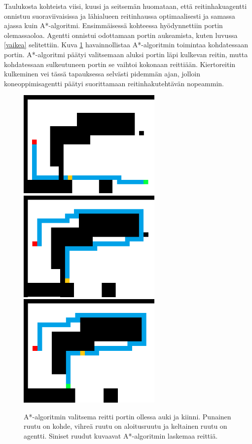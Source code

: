 \documentclass[utf8]{gradu3}
\begin{document}
Taulukosta kohteista viisi, kuusi ja seitsemän huomataan, että reitinhakuagentti onnistuu suoraviivaisissa ja lähialueen reitinhaussa optimaalisesti ja samassa ajassa kuin A*-algoritmi. Ensimmäisessä kohteessa hyödynnettiin portin olemassaoloa. Agentti onnistui odottamaan portin aukeamista, kuten luvussa \ref{vaikea} selitettiin. Kuva \ref{astargate} havainnollistaa A*-algoritmin toimintaa kohdatessaan portin. A*-algoritmi päätyi valitsemaan aluksi portin läpi kulkevan reitin, mutta kohdatessaan sulkeutuneen portin se vaihtoi kokonaan reittiään. Kiertoreitin kulkeminen vei tässä tapauksessa selvästi pidemmän ajan, jolloin koneoppimisagentti päätyi suorittamaan reitinhakutehtävän nopeammin.

\begin{figure}[h]
\includegraphics[width=7cm]{a_star_gate_collision.png}
\hspace{1 cm}
\vspace{1 cm}
\includegraphics[width=7cm]{a_star_detour.png}
\includegraphics[width=7cm]{a_star_detour_no_gate.png}
\caption{A*-algoritmin valitsema reitti portin ollessa auki ja kiinni. Punainen ruutu on kohde, vihreä ruutu on aloitusruutu ja keltainen ruutu on agentti. Siniset ruudut kuvaavat A*-algoritmin laskemaa reittiä.}
\label{astargate}
\end{figure}
\end{document}
